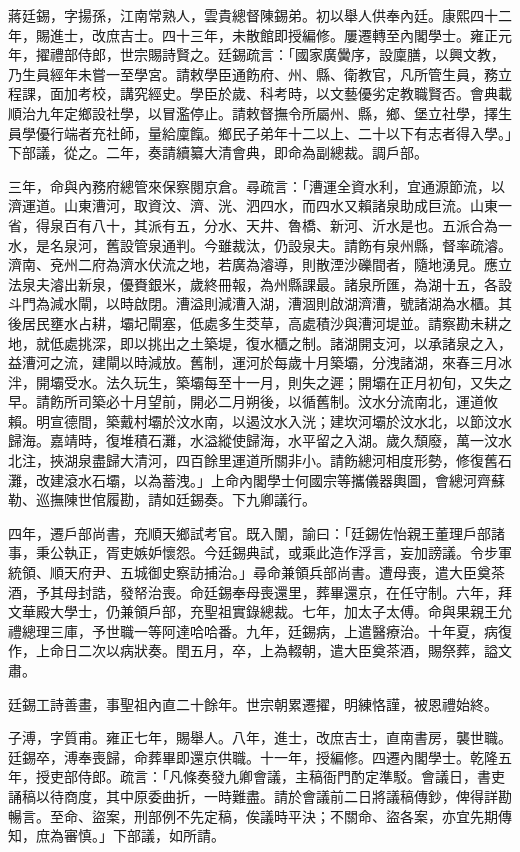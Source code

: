 \begin{pinyinscope}
蔣廷錫，字揚孫，江南常熟人，雲貴總督陳錫弟。初以舉人供奉內廷。康熙四十二年，賜進士，改庶吉士。四十三年，未散館即授編修。屢遷轉至內閣學士。雍正元年，擢禮部侍郎，世宗賜詩賢之。廷錫疏言：「國家廣黌序，設廩膳，以興文教，乃生員經年未嘗一至學宮。請敕學臣通飭府、州、縣、衛教官，凡所管生員，務立程課，面加考校，講究經史。學臣於歲、科考時，以文藝優劣定教職賢否。會典載順治九年定鄉設社學，以冒濫停止。請敕督撫令所屬州、縣，鄉、堡立社學，擇生員學優行端者充社師，量給廩餼。鄉民子弟年十二以上、二十以下有志者得入學。」下部議，從之。二年，奏請續纂大清會典，即命為副總裁。調戶部。

三年，命與內務府總管來保察閱京倉。尋疏言：「漕運全資水利，宜通源節流，以濟運道。山東漕河，取資汶、濟、洸、泗四水，而四水又賴諸泉助成巨流。山東一省，得泉百有八十，其派有五，分水、天井、魯橋、新河、沂水是也。五派合為一水，是名泉河，舊設管泉通判。今雖裁汰，仍設泉夫。請飭有泉州縣，督率疏濬。濟南、兗州二府為濟水伏流之地，若廣為濬導，則散湮沙礫間者，隨地湧見。應立法泉夫濬出新泉，優賚銀米，歲終冊報，為州縣課最。諸泉所匯，為湖十五，各設斗門為減水閘，以時啟閉。漕溢則減漕入湖，漕涸則啟湖濟漕，號諸湖為水櫃。其後居民壅水占耕，壩圮閘塞，低處多生茭草，高處積沙與漕河堤並。請察勘未耕之地，就低處挑深，即以挑出之土築堤，復水櫃之制。諸湖開支河，以承諸泉之入，益漕河之流，建閘以時減放。舊制，運河於每歲十月築壩，分洩諸湖，來春三月冰泮，開壩受水。法久玩生，築壩每至十一月，則失之遲；開壩在正月初旬，又失之早。請飭所司築必十月望前，開必二月朔後，以循舊制。汶水分流南北，運道攸賴。明宣德間，築戴村壩於汶水南，以遏汶水入洸；建坎河壩於汶水北，以節汶水歸海。嘉靖時，復堆積石灘，水溢縱使歸海，水平留之入湖。歲久頹廢，萬一汶水北注，挾湖泉盡歸大清河，四百餘里運道所關非小。請飭總河相度形勢，修復舊石灘，改建滾水石壩，以為蓄洩。」上命內閣學士何國宗等攜儀器輿圖，會總河齊蘇勒、巡撫陳世倌履勘，請如廷錫奏。下九卿議行。

四年，遷戶部尚書，充順天鄉試考官。既入闈，諭曰：「廷錫佐怡親王董理戶部諸事，秉公執正，胥吏嫉妒懷怨。今廷錫典試，或乘此造作浮言，妄加謗議。令步軍統領、順天府尹、五城御史察訪捕治。」尋命兼領兵部尚書。遭母喪，遣大臣奠茶酒，予其母封誥，發帑治喪。命廷錫奉母喪還里，葬畢還京，在任守制。六年，拜文華殿大學士，仍兼領戶部，充聖祖實錄總裁。七年，加太子太傅。命與果親王允禮總理三庫，予世職一等阿達哈哈番。九年，廷錫病，上遣醫療治。十年夏，病復作，上命日二次以病狀奏。閏五月，卒，上為輟朝，遣大臣奠茶酒，賜祭葬，謚文肅。

廷錫工詩善畫，事聖祖內直二十餘年。世宗朝累遷擢，明練恪謹，被恩禮始終。

子溥，字質甫。雍正七年，賜舉人。八年，進士，改庶吉士，直南書房，襲世職。廷錫卒，溥奉喪歸，命葬畢即還京供職。十一年，授編修。四遷內閣學士。乾隆五年，授吏部侍郎。疏言：「凡條奏發九卿會議，主稿衙門酌定準駁。會議日，書吏誦稿以待商度，其中原委曲折，一時難盡。請於會議前二日將議稿傳鈔，俾得詳勘暢言。至命、盜案，刑部例不先定稿，俟議時平決；不關命、盜各案，亦宜先期傳知，庶為審慎。」下部議，如所請。


\end{pinyinscope}
